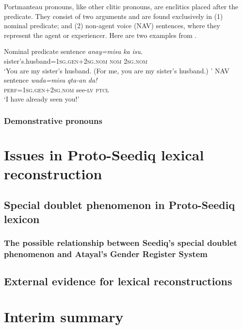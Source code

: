 Portmanteau pronouns, like other clitic pronouns, are enclitics placed after the predicate. They consist of two arguments and are found exclusively in (1) nominal predicate; and (2) non-agent voice (NAV) sentences, where they represent the agent or experiencer. Here are two examples from \textcite[74--75]{Lee2018Trugrammar}.

\begin{exe}

    \ex Nominal predicate sentence
    \gll \textit{anay=misu} \textit{ka} \textit{isu.} \\
    sister's.husband=\textsc{1sg.gen+2sg.nom} \textsc{nom} \textsc{2sg.nom}\\
    \trans `You are my sister's husband. (For me, you are my sister's husband.) '
    \ex NAV sentence
    \gll \textit{wada=misu} \textit{qta-an} \textit{da!} \\
    \textsc{perf}=\textsc{1sg.gen+2sg.nom} see-\textsc{lv} \textsc{ptcl}\\
    \trans `I have already seen you!'
\end{exe}

\subsubsection{Demonstrative pronouns}
\lipsum[1-10]

\section{Issues in Proto-Seediq lexical reconstruction} \label{sec:psed_lexicon}
\lipsum[1]

\subsection{Special doublet phenomenon in Proto-Seediq lexicon} \label{sec:sepical_doublet}
\lipsum[1-15]

\subsubsection{The possible relationship between Seediq's special doublet phenomenon and Atayal's Gender Register System}
\lipsum[1-7]

\subsection{External evidence for lexical reconstructions} \label{sec:external_lexical_evidence}
\lipsum[1-7]

\section{Interim summary}
\lipsum[1-4]
